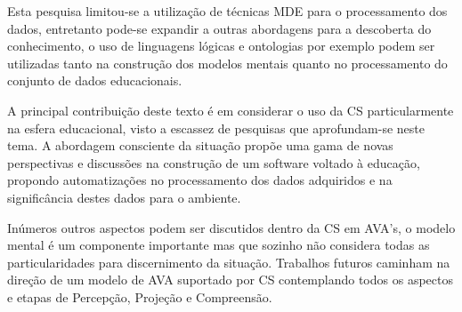 \documentclass[12pt]{article}
\begin{document}
Esta pesquisa limitou-se a utilização de técnicas MDE para o processamento dos dados, entretanto pode-se expandir a outras abordagens para a descoberta do conhecimento, o uso de linguagens lógicas e ontologias por exemplo podem ser utilizadas tanto na construção dos modelos mentais quanto no processamento do conjunto de dados educacionais.

A principal contribuição deste texto é em considerar o uso da CS particularmente na esfera educacional, visto a escassez de pesquisas que aprofundam-se neste tema. A abordagem consciente da situação propõe uma gama de novas perspectivas e discussões na construção de um software voltado à educação, propondo automatizações no processamento dos dados adquiridos e na significância destes dados para o ambiente.  

Inúmeros outros aspectos podem ser discutidos dentro da CS em AVA's, o modelo mental é um componente importante mas que sozinho não considera todas as particularidades para discernimento da situação. Trabalhos futuros caminham na direção de um modelo de AVA suportado por CS contemplando todos os aspectos e etapas de Percepção, Projeção e Compreensão.



\end{document}
